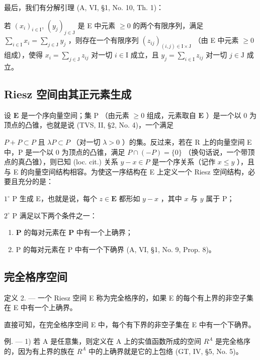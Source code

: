 最后，我们有分解引理 (A, VI, §1, No. 10, Th. 1)：

若 \((x_{i})_{i\in \mathrm{I}}\), \((y_{j})_{j\in \mathrm{J}}\) 是 E 中元素 \(\geqslant 0\) 的两个有限序列，满足 \(\sum_{i\in \mathrm{I}}x_i = \sum_{j\in \mathrm{J}}y_j\) ，则存在一个有限序列 \((z_{ij})_{(i,j)\in \mathrm{I}\times \mathrm{J}}\) （由 E 中元素 \(\geqslant 0\) 组成），使得 \(x_{i} = \sum_{j\in \mathrm{J}}z_{ij}\) 对一切 \(i\in \mathrm{I}\) 成立，且 \(y_{j} = \sum_{i\in \mathrm{I}}z_{ij}\) 对一切 \(j\in \mathrm{J}\) 成立。

\subsection{Riesz 空间由其正元素生成}

设 \(\mathbf{E}\) 是一个序向量空间；集 \(\mathrm{P}\) （由元素 \(\geqslant 0\) 组成，元素取自 \(\mathbf{E}\) ）是一个以 0 为顶点的凸锥，也就是说 (TVS, II, §2, No. 4)，一个满足

\(P + P \subset P\) 且 \(\lambda P \subset P\) （对一切 \(\lambda > 0\) ）的集。反过来，若在 R 上的向量空间 E 中，P 是一个以 0 为顶点的凸锥，满足 \(P \cap (-P) = \{0\}\) （换句话说，一个带顶点的真凸锥），则已知 (loc. cit.) 关系 \(y - x \in P\) 是一个序关系（记作 \(x \leqslant y\) ），且与 E 的向量空间结构相容。为使这一序结构在 E 上定义一个 Riesz 空间结构，必要且充分的是：

\(1^{\circ}\) P 生成 E，也就是说，每个 \(z \in \mathbf{E}\) 都形如 \(y - x\) ，其中 \(x\) 与 \(y\) 属于 P；

\(2^{\circ}\) P 满足以下两个条件之一：

\begin{enumerate}
\def\labelenumi{\alph{enumi})}
\item
  \(\mathbf{P}\) 的每对元素在 \(\mathbf{P}\) 中有一个上确界；
\item
  P 的每对元素在 P 中有一个下确界 (A, VI, §1, No. 9, Prop. 8)。
\end{enumerate}

\subsection{完全格序空间}

定义 2. --- 一个 Riesz 空间 E 称为完全格序的，如果 E 的每个有上界的非空子集在 E 中有一个上确界。

直接可知，在完全格序空间 E 中，每个有下界的非空子集在 E 中有一个下确界。

例. --- 1) 若 A 是任意集，则定义在 A 上的实值函数所成的空间 \(R^{A}\) 是完全格序的，因为有上界的族在 \(R^{A}\) 中的上确界就是它的上包络 (GT, IV, §5, No. 5)。

